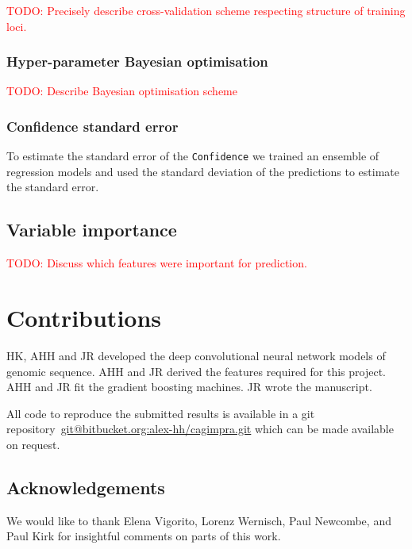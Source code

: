 \documentclass{article}
\newcommand{\todo}[1]{\textcolor{red}{TODO: #1}}
\begin{document}
\todo{Precisely describe cross-validation scheme respecting structure of
training loci.}



\subsubsection*{Hyper-parameter Bayesian optimisation}

\todo{Describe Bayesian optimisation scheme}


\subsubsection*{Confidence standard error}

To estimate the standard error of the \texttt{Confidence} we trained an
ensemble of regression models and used the standard deviation of the
predictions to estimate the standard error.


\subsection*{Variable importance}

\todo{Discuss which features were important for prediction.}


\section*{Contributions}

HK, AHH and JR developed the deep convolutional neural network models of
genomic sequence. AHH and JR derived the features required for this
project. AHH and JR fit the gradient boosting machines. JR wrote the
manuscript.

All code to reproduce the submitted results is available in a git
repository~\url{git@bitbucket.org:alex-hh/cagimpra.git} which can be made
available on request.


\subsection*{Acknowledgements}

We would like to thank Elena Vigorito, Lorenz Wernisch, Paul Newcombe, and Paul
Kirk for insightful comments on parts of this work.

%
%
\printbibliography
\end{document}
